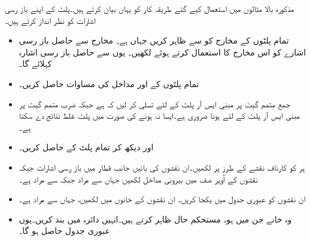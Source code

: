 مذکورہ بالا مثالوں میں استعمال کیے گئے طریقہ کار کو یہاں بیان کرتے ہیں۔پلٹ کے اپنے باز رسی اشارات کو نظر انداز کرتے ہیں۔
\begin{itemize}
\item
 تمام پلٹوں کے مخارج کو سے ظاہر کریں جہاں ہے۔ مخارج سے حاصل باز رسی اشارے کو اس مخارج کا  استعمال کرتے ہوئے  لکھیں۔ یوں  سے حاصل باز رسی اشارہ  کہلائے گا۔
\item
 تمام پلٹوں کے  اور  مداخل کی مساوات حاصل کریں۔
\item
 جمع متمم گیٹ پر مبنی ایس آر پلٹ کے لئے تسلی کر لیں کہ  ہے جبکہ ضرب متمم گیٹ پر مبنی ایس آر پلٹ کے لئے  ہونا ضروری ہے۔ایسا نہ ہونے کی صورت میں پلٹ غلط نتائج دے سکتا ہے۔
\item 
{} اور  دیکھ کر تمام پلٹ کے  حاصل کریں۔
\item
 ہر  کو کارناف نقشے کے طرز پر لکھیں۔ان نقشوں کی بائیں جانب قطار میں باز رسی اشارات  جبکہ نقشوں کے اُوپر صف میں بیرونی مداخل  لکھیں جہاں  سے مراد  جبکہ  سے مراد  ہے۔
\item
 ان نقشوں کو عبوری جدول میں یکجا کریں۔ ان نقشوں کے خانوں میں  لکھیں، جہاں  سے مراد  ہے۔
\item
 وہ خانے جن میں  ہو، مستحکم حال ظاہر کرتے ہیں۔انہیں دائرہ میں بند کریں۔یوں عبوری جدول حاصل ہو گا۔
\end{itemize}

